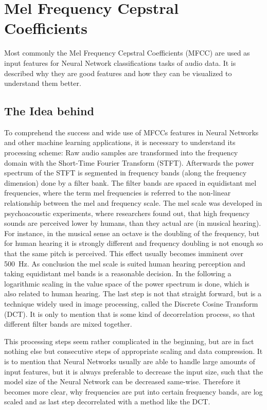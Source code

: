 
\section{Mel Frequency Cepstral Coefficients}\label{sec:signal_mfcc}
Most commonly the Mel Frequency Cepstral Coefficients (MFCC) are used as input features for Neural Network classifications tasks of audio data.
It is described why they are good features and how they can be visualized to understand them better.

\subsection{The Idea behind}
To comprehend the success and wide use of MFCCs features in Neural Networks and other machine learning applications, it is necessary to understand its processing scheme:
Raw audio samples are transformed into the frequency domain with the Short-Time Fourier Transform (STFT).
Afterwards the power spectrum of the STFT is segmented in frequency bands (along the frequency dimension) done by a filter bank.
The filter bands are spaced in equidistant mel frequencies,
where the term mel frequencies is referred to the non-linear relationship between the mel and frequency scale.
The mel scale was developed in psychoacoustic experiments, where researchers found out, that high frequency sounds are perceived lower by humans, than they actual are (in musical hearing). For instance, in the musical sense an octave is the doubling of the frequency, but for human hearing it is strongly different and frequency doubling is not enough so that the same pitch is perceived.
This effect usually becomes imminent over \SI{500}{\hertz}.
As conclusion the mel scale is suited human hearing perception and taking equidistant mel bands is a reasonable decision.
In the following a logarithmic scaling in the value space of the power spectrum is done, which is also related to human hearing.
The last step is not that straight forward, but is a technique widely used in image processing, called the Discrete Cosine Transform (DCT).
It is only to mention that is some kind of decorrelation process, so that different filter bands are mixed together.

This processing steps seem rather complicated in the beginning, but are in fact nothing else but consecutive steps of appropriate scaling and data compression.
It is to mention that Neural Networks usually are able to handle large amounts of input features, but it is always preferable to decrease the input size, such that the model size of the Neural Network can be decreased same-wise.
Therefore it becomes more clear, why frequencies are put into certain frequency bands, are log scaled and as last step decorrelated with a method like the DCT.


